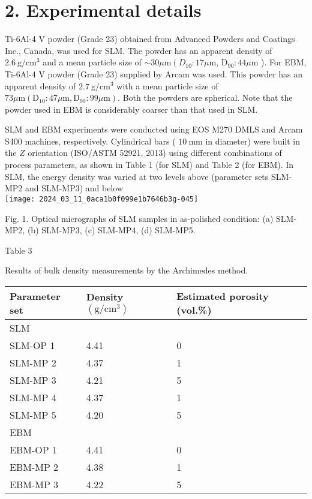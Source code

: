 \documentclass[10pt]{article}
\begin{document}
\section*{2. Experimental details}
Ti-6Al-4 V powder (Grade 23) obtained from Advanced Powders and Coatings Inc., Canada, was used for SLM. The powder has an apparent density of $2.6 \mathrm{~g} / \mathrm{cm}^{3}$ and a mean particle size of $\sim 30 \mu \mathrm{m}\left(D_{10}: 17 \mu \mathrm{m}\right.$, $\mathrm{D}_{90}: 44 \mu \mathrm{m}$ ). For EBM, Ti-6Al-4 V powder (Grade 23) supplied by Arcam was used. This powder has an apparent density of $2.7 \mathrm{~g} / \mathrm{cm}^{3}$ with a mean particle size of $73 \mu \mathrm{m}\left(\mathrm{D}_{10}: 47 \mu \mathrm{m}, \mathrm{D}_{90}: 99 \mu \mathrm{m}\right)$. Both the powders are spherical. Note that the powder used in EBM is considerably coarser than that used in SLM.

SLM and EBM experiments were conducted using EOS M270 DMLS and Arcam S400 machines, respectively. Cylindrical bars ( $10 \mathrm{~mm}$ in diameter) were built in the $Z$ orientation (ISO/ASTM 52921, 2013) using different combinations of process parameters, as shown in Table 1 (for SLM) and Table 2 (for EBM). In SLM, the energy density was varied at two levels above (parameter sets SLM-MP2 and SLM-MP3) and below\\
\texttt{[image: 2024\_03\_11\_0aca1b0f099e1b7646b3g-045]}

Fig. 1. Optical micrographs of SLM samples in as-polished condition: (a) SLM-MP2, (b) SLM-MP3, (c) SLM-MP4, (d) SLM-MP5.

Table 3

Results of bulk density measurements by the Archimedes method.

\begin{center}
\begin{tabular}{lll}
\hline
Parameter set & Density $\left(\mathrm{g} / \mathrm{cm}^{3}\right)$ & Estimated porosity (vol.\%) \\
\hline
SLM &  &  \\
SLM-OP 1 & 4.41 & 0 \\
SLM-MP 2 & 4.37 & 1 \\
SLM-MP 3 & 4.21 & 5 \\
SLM-MP 4 & 4.37 & 1 \\
SLM-MP 5 & 4.20 & 5 \\
EBM &  &  \\
EBM-OP 1 & 4.41 & 0 \\
EBM-MP 2 & 4.38 & 1 \\
EBM-MP 3 & 4.22 & 5 \\
\hline
\end{tabular}
\end{center}
\end{document}

